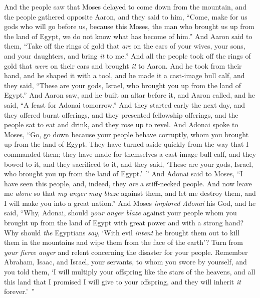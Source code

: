 \begin{biblechapter} %
 And the people saw that Moses delayed to come down from the mountain, and the people gathered opposite Aaron, and they said to him, “Come, make for us gods who will go before us, because this Moses, the man who brought us up from the land of Egypt, we do not know what has become of him.”
\verse And Aaron said to them, “Take off the rings of gold that \textit{are} on the ears of your wives, your sons, and your daughters, and bring \textit{it} to me.”
\verse And all the people took off the rings of gold that \textit{were} on their ears and brought \textit{it} to Aaron.
\verse And he took from their hand, and he shaped it with a tool, and he made it a cast-image bull calf, and they said, “These are your gods, Israel, who brought you up from the land of Egypt.”
\verse And Aaron saw, and he built an altar before it, and Aaron called, and he said, “A feast for Adonai tomorrow.”
\verse And they started early the next day, and they offered burnt offerings, and they presented fellowship offerings, and the people sat to eat and drink, and they rose up to revel.
\verse And Adonai spoke to Moses, “Go, go down because your people behave corruptly, whom you brought up from the land of Egypt.
\verse They have turned aside quickly from the way that I commanded them; they have made for themselves a cast-image bull calf, and they bowed to it, and they sacrificed to it, and they said, ‘These are your gods, Israel, who brought you up from the land of Egypt.’ ”
\verse And Adonai said to Moses, “I have seen this people, and, indeed, they \textit{are} a stiff-necked people.
\verse And now leave me \textit{alone} so that \textit{my anger may blaze} against them, and let me destroy them, and I will make you into a great nation.”
\verse And Moses \textit{implored Adonai} his God, and he said, “Why, Adonai, should \textit{your anger blaze} against your people whom you brought up from the land of Egypt with great power and with a strong hand?
\verse Why should \textit{the} Egyptians \textit{say}, ‘With evil \textit{intent} he brought them out to kill them in the mountains and wipe them from the face of the earth’? Turn from \textit{your fierce anger} and relent concerning the disaster for your people.
\verse Remember Abraham, Isaac, and Israel, your servants, to whom you swore by yourself, and you told them, ‘I will multiply your offspring like the stars of the heavens, and all this land that I promised I will give to your offspring, and they will inherit \textit{it} forever.’ ”

\end{biblechapter}
